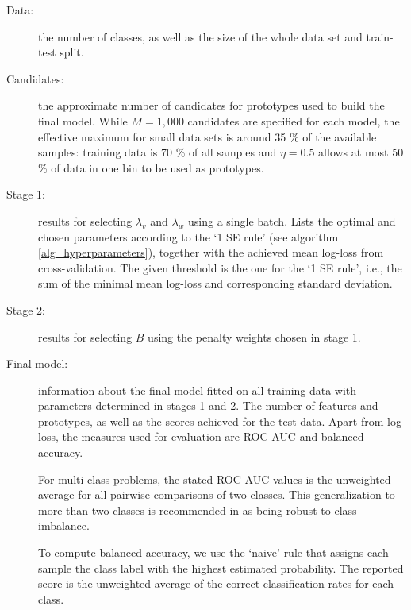 \begin{description}
\item[Data:] the number of classes, as well as the size of the whole data set and train-test split.
%
\item[Candidates:] the approximate number of candidates for prototypes used to build the final model.
While $M=1,000$ candidates are specified for each model, the effective maximum for small data sets is around 35 \% of the available samples: training data is 70 \% of all samples and $\eta=0.5$ allows at most 50 \% of data in one bin to be used as prototypes.
%
\item[Stage 1:] results for selecting $\lambda_v$ and $\lambda_w$ using a single batch.
Lists the optimal and chosen parameters according to the `1 SE rule' (see algorithm \ref{alg_hyperparameters}), together with the achieved mean log-loss from cross-validation.
The given threshold is the one for the `1 SE rule', i.e., the sum of the minimal mean log-loss and corresponding standard deviation.
%
\item[Stage 2:] results for selecting $B$ using the penalty weights chosen in stage 1.
%
\item[Final model:] information about the final model fitted on all training data with parameters determined in stages 1 and 2.
The number of features and prototypes, as well as the scores achieved for the test data.
Apart from log-loss, the measures used for evaluation are ROC-AUC and balanced accuracy.\par
%
For multi-class problems, the stated ROC-AUC values is the unweighted average for all pairwise comparisons of two classes.
This generalization to more than two classes is recommended in \cite{Hand_01} as being robust to class imbalance.\par
%
To compute balanced accuracy, we use the `naive' rule that assigns each sample the class label with the highest estimated probability.
The reported score is the unweighted average of the correct classification rates for each class.
\end{description}
%
